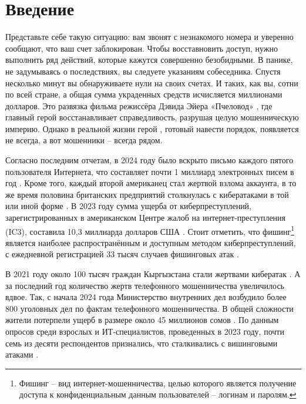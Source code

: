 \section*{\centering Введение}

Представьте себе такую ситуацию: вам звонят с незнакомого номера и уверенно сообщают, что ваш счет заблокирован. Чтобы восставновить доступ, нужно выполнить ряд действий, которые кажутся совершенно безобидными. В панике, не задумываясь о последствиях, вы следуете указаниям собеседника. Спустя несколько минут вы обнаруживаете нули на своих счетах. И таких, как вы, сотни по всей стране, а общая сумма украденных средств исчисляется миллионами долларов. Это развязка фильма режиссёра Дэвида Эйера «Пчеловод» \cite{beekeeper2024}, где главный герой восстанавливает справедливость, разрушая целую мошенническую империю. Однако в реальной жизни герой \cite{fraud2024}, готовый навести порядок, появляется не всегда, а вот мошенники – всегда рядом.

Согласно последним отчетам, в 2024 году было вскрыто письмо каждого пятого пользователя Интернета, что составляет почти 1 миллиард электронных писем в год \cite{griffiths2024phishing}. Кроме того, каждый второй американец стал жертвой взлома аккаунта, в то же время половина британских предприятий столкнулась с кибератаками в той или иной форме \cite{griffiths2024cybercrime}. В 2023 году сумма ущерба от киберпреступлений, зарегистрированных в американском Центре жалоб на интернет-преступления (IC3), составила 10,3 миллиарда долларов США \cite{petrosyan2023}. Стоит отметить, что фишинг\footnote{Фишинг –  вид интернет-мошенничества, целью которого является получение доступа к конфиденциальным данным пользователей – логинам и паролям.} является наиболее распространённым и доступным методом киберпреступлений, с ежедневной регистрацией 33 тысяч случаев фишинговых атак \cite{lewis2018}. 

В 2021 году около 100 тысяч граждан Кыргызстана стали жертвами кибератак \cite{kopytin2023}. А за последний год количество жертв телефонного мошенничества увеличилось вдвое. Так, с начала 2024 года Министерство внутренних дел возбудило более 800 уголовных дел по фактам телефонного мошенничества. В общей сложности жители потерпели ущерб в размере около 45 миллионов сомов \cite{amatbekova2024}. По данным опросов среди взрослых и ИТ-специалистов, проведенных в 2023 году, почти семь из десяти респондентов признались, что сталкивались с вишинговыми атаками \cite{petrosyan2024}.

